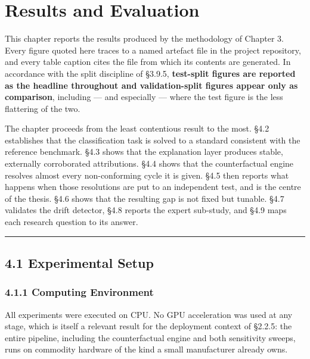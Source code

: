\hypertarget{results-and-evaluation}{%
\chapter{Results and Evaluation}\label{results-and-evaluation}}

This chapter reports the results produced by the methodology of Chapter 3. Every figure quoted here traces to a named artefact file in the project repository, and every table caption cites the file from which its contents are generated. In accordance with the split discipline of §3.9.5, \textbf{test-split figures are reported as the headline throughout and validation-split figures appear only as comparison}, including --- and especially --- where the test figure is the less flattering of the two.

The chapter proceeds from the least contentious result to the most. §4.2 establishes that the classification task is solved to a standard consistent with the reference benchmark. §4.3 shows that the explanation layer produces stable, externally corroborated attributions. §4.4 shows that the counterfactual engine resolves almost every non-conforming cycle it is given. §4.5 then reports what happens when those resolutions are put to an independent test, and is the centre of the thesis. §4.6 shows that the resulting gap is not fixed but tunable. §4.7 validates the drift detector, §4.8 reports the expert sub-study, and §4.9 maps each research question to its answer.

\begin{center}\rule{0.5\linewidth}{0.5pt}\end{center}

\hypertarget{experimental-setup}{%
\section{4.1 Experimental Setup}\label{experimental-setup}}

\hypertarget{computing-environment}{%
\subsection{4.1.1 Computing Environment}\label{computing-environment}}

All experiments were executed on CPU. No GPU acceleration was used at any stage, which is itself a relevant result for the deployment context of §2.2.5: the entire pipeline, including the counterfactual engine and both sensitivity sweeps, runs on commodity hardware of the kind a small manufacturer already owns.

